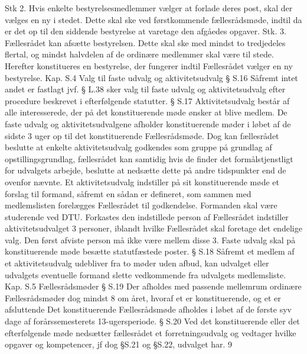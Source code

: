 Stk 2. Hvis enkelte bestyrelsesmedlemmer vælger at forlade deres post, skal der vælges en ny i stedet. Dette
skal ske ved førstkommende fællesrådsmøde, indtil da er det op til den siddende bestyrelse at varetage den
afgåedes opgaver.
Stk. 3. Fællesrådet kan afsætte bestyrelsen. Dette skal ske med mindst to tredjedeles flertal, og mindst
halvdelen af de ordinære medlemmer skal være til stede.
Herefter konstitueres en bestyrelse, der fungerer indtil Fællesrådet vælger en ny bestyrelse.
Kap. S.4 Valg til faste udvalg og aktivitetsudvalg
§ S.16 Såfremt intet andet er fastlagt jvf. § L.38 sker valg til faste udvalg og aktivitetsudvalg efter procedure
         beskrevet i efterfølgende statutter.
§ S.17 Aktivitetsudvalg består af alle interesserede, der på det konstituerende møde ønsker at blive medlem. De
           faste udvalg og aktivitetsudvalgene afholder konstituerende møder i løbet af de sidste 3 uger op til det
            konstituerende Fællesrådsmøde.
              Dog kan fællesrådet beslutte at enkelte aktivitetsudvalg godkendes som gruppe på grundlag af
                opstillingsgrundlag, fællesrådet kan samtidig hvis de finder det formålstjenstligt for udvalgets arbejde,
                  beslutte at nedsætte dette på andre tidspunkter end de ovenfor nævnte.
                    Et aktivitetsudvalg indstiller på sit konstituerende møde et forslag til formand, såfremt en sådan er defineret,
                       som sammen med medlemslisten forelægges Fællesrådet til godkendelse. Formanden skal være studerende
                          ved DTU. Forkastes den indstillede person af Fællesrådet indstiller aktivitetsudvalget 3 personer, iblandt
                           hvilke Fællesrådet skal foretage det endelige valg. Den først afviste person må ikke være mellem disse 3.
                               Faste udvalg skal på konstituerende møde besætte statutfæstede poster.
§ S.18 Såfremt et medlem af et aktivitetsudvalg udebliver fra to møder uden afbud, kan udvalget eller udvalgets
         eventuelle formand slette vedkommende fra udvalgets medlemsliste.
Kap. S.5 Fællesrådsmøder
§ S.19 Der afholdes med passende mellemrum ordinære Fællesrådsmøder dog mindst 8 om året, hvoraf et er
            konstituerende, og et er afsluttende Det konstituerende Fællesrådsmøde afholdes i løbet af de første syv dage
                af forårssemesterets 13-ugersperiode.
§ S.20 Ved det konstituerende eller det efterfølgende møde nedsætter fællesrådet et forretningsudvalg og vedtager
            hvilke opgaver og kompetencer, jf dog §S.21 og §S.22, udvalget har.
9

